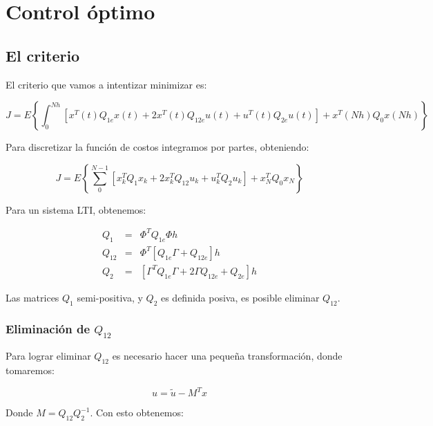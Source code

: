 \chapter{Control óptimo} 

\section{El criterio}

El criterio que vamos a intentizar minimizar es: 

\begin{equation}
    J = E\left\{
        \int_0^{Nh} \left[
            x^T(t) Q_{1e} x(t)
            + 2x^T(t) Q_{12e}u(t)
            + u^T(t)Q_{2e}u(t)
        \right]
        + x^T(Nh)Q_{0}x(Nh)
     \right\}
\end{equation}

Para discretizar la función de costos integramos por partes, obteniendo: 

\begin{equation}
    J = E\left\{ \sum_0^{N-1} \left[ 
        x^T_kQ_1x_k
        + 2x^T_kQ_{12}u_k
        + u^T_kQ_2u_k
    \right] + x^T_NQ_0x_N \right\}
\end{equation}

Para un sistema LTI, obtenemos: 

\begin{equation}
    \begin{array}{ccc}
        Q_1 & = & \Phi^TQ_{1e}\Phi h \\
        Q_{12} & = & \Phi^T[Q_{1e}\Gamma + Q_{12e}]h \\ 
        Q_2 & = & [\Gamma^TQ_{1e}\Gamma + 2\Gamma Q_{12e} + Q_{2e}]h
    \end{array}
\end{equation}

Las matrices $Q_1$ semi-positiva, y $Q_2$ es definida posiva, es posible eliminar $Q_{12}$.

\subsection{Eliminación de $Q_{12}$}

Para lograr eliminar $Q_{12}$ es necesario hacer una pequeña transformación, donde tomaremos: 

\begin{equation}
    u = \tilde{u} - M^Tx
\end{equation}

Donde $M=Q_{12}Q_2^{-1}$. Con esto obtenemos: 

